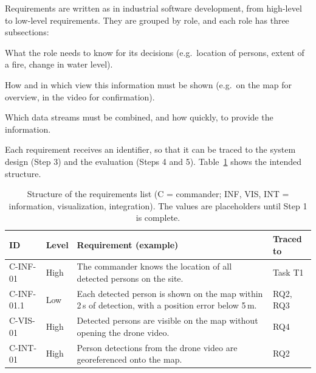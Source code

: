 \documentclass{article}
\begin{document}
Requirements are written as in industrial software development, from high-level to low-level requirements.
They are grouped by role, and each role has three subsections:
\begin{description}[style=nextline]
  \item[Information requirements] What the role needs to know for its decisions (e.g.\ location of persons, extent of a fire, change in water level).
  \item[Visualization requirements] How and in which view this information must be shown (e.g.\ on the map for overview, in the video for confirmation).
  \item[Integration requirements] Which data streams must be combined, and how quickly, to provide the information.
\end{description}
Each requirement receives an identifier, so that it can be traced to the system design (Step 3) and the evaluation (Steps 4 and 5).
Table~\ref{tab:req-template} shows the intended structure.

\begin{table}[h]
\centering
\small
\renewcommand{\arraystretch}{1.3}
\begin{tabularx}{\textwidth}{@{}l>{\raggedright\arraybackslash}p{2.2cm}>{\raggedright\arraybackslash}X>{\raggedright\arraybackslash}p{2.2cm}@{}}
\toprule
\textbf{ID} & \textbf{Level} & \textbf{Requirement (example)} & \textbf{Traced to} \\
\midrule
C-INF-01 & High & The commander knows the location of all detected persons on the site. & Task T1 \\
C-INF-01.1 & Low & Each detected person is shown on the map within 2\,s of detection, with a position error below 5\,m. & RQ2, RQ3 \\
C-VIS-01 & High & Detected persons are visible on the map without opening the drone video. & RQ4 \\
C-INT-01 & High & Person detections from the drone video are georeferenced onto the map. & RQ2 \\
\bottomrule
\end{tabularx}
\caption{Structure of the requirements list (C = commander; INF, VIS, INT = information, visualization, integration). The values are placeholders until Step 1 is complete.}
\label{tab:req-template}
\end{table}

\end{document}
